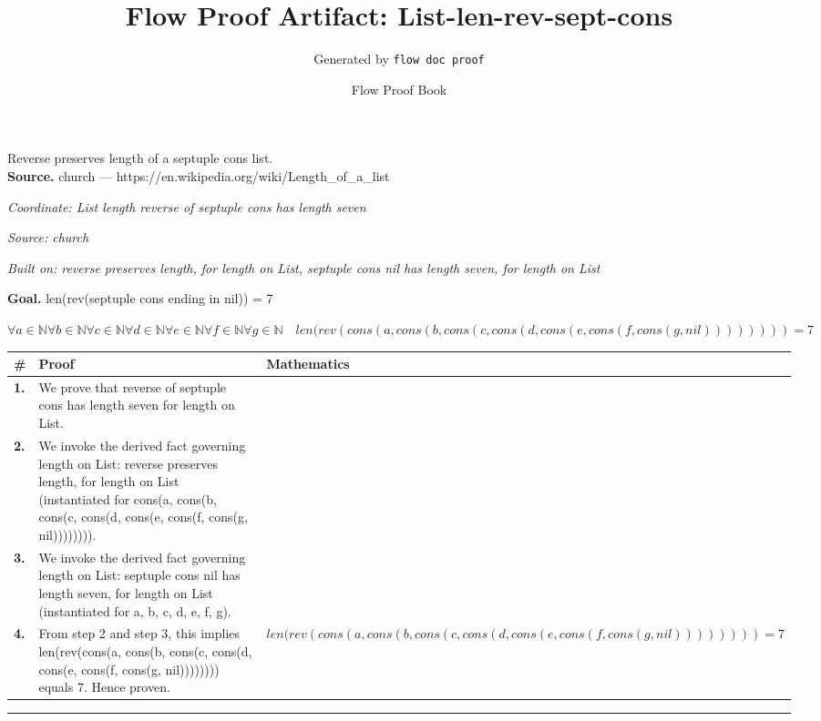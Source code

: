 \documentclass[11pt]{article}
\title{Flow Proof Artifact: List-len-rev-sept-cons}
\author{Generated by \texttt{flow doc proof}}
\date{Flow Proof Book}
\theoremstyle{definition}
\begin{document}
\maketitle
Reverse preserves length of a septuple cons list.\\[0.5em]
\textbf{Source.} church — https://en.wikipedia.org/wiki/Length\_of\_a\_list\\[0.5em]
\bigskip
{}\par
\smallskip\noindent\textit{Coordinate: List \cdot length \cdot reverse of septuple cons has length seven}\par
\smallskip\noindent\textit{Source: church}\par
\smallskip\noindent\textit{Built on: reverse preserves length, for length on List, septuple cons nil has length seven, for length on List}\par
\medskip
\noindent\textbf{Goal.} len(rev(septuple cons ending in nil)) = 7\par
\noindent$\displaystyle \forall a \in \mathbb{N} \forall b \in \mathbb{N} \forall c \in \mathbb{N} \forall d \in \mathbb{N} \forall e \in \mathbb{N} \forall f \in \mathbb{N} \forall g \in \mathbb{N}\quad len(rev(cons(a, cons(b, cons(c, cons(d, cons(e, cons(f, cons(g, nil)))))))) = 7$\par
\medskip
\noindent
\begin{tabular}{@{} >{\raggedright\arraybackslash}p{} >{\raggedright\arraybackslash}p{} >{\raggedleft\arraybackslash}p{} @{}}
\textbf{\#} & \textbf{Proof} & \textbf{Mathematics} \\
\midrule
\textbf{1.} & We prove that reverse of septuple cons has length seven for length on List. & \\[0.45em]
\textbf{2.} & We invoke the derived fact governing length on List: reverse preserves length, for length on List (instantiated for cons(a, cons(b, cons(c, cons(d, cons(e, cons(f, cons(g, nil)))))))). & \\[0.45em]
\textbf{3.} & We invoke the derived fact governing length on List: septuple cons nil has length seven, for length on List (instantiated for a, b, c, d, e, f, g). & \\[0.45em]
\textbf{4.} & From step 2 and step 3, this implies len(rev(cons(a, cons(b, cons(c, cons(d, cons(e, cons(f, cons(g, nil)))))))) equals 7. Hence proven. & $\displaystyle len(rev(cons(a, cons(b, cons(c, cons(d, cons(e, cons(f, cons(g, nil)))))))) = 7$ \\[0.45em]
\bottomrule
\end{tabular}
\label{thm:List-length-reverse_of_septuple_cons_has_length_seven}
\par\medskip\hrule
\end{document}
